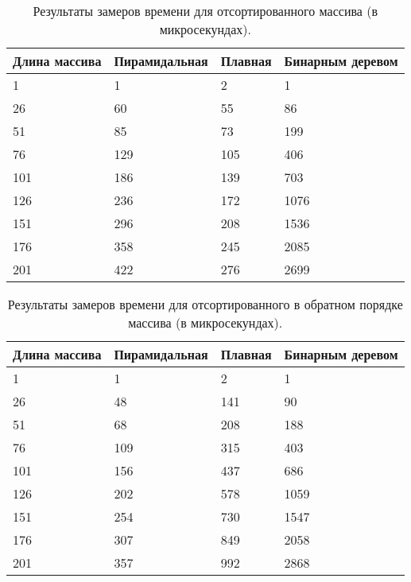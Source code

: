 \begin{table}[h]
	\begin{center}
		\captionsetup{justification=raggedright,singlelinecheck=off}
		\caption{\label{tbl:best}Результаты замеров времени для отсортированного массива (в микросекундах).}
		\begin{tabular}{|l|l|l|l|}
			
			\hline
			Длина массива&Пирамидальная&Плавная&Бинарным деревом\\
			\hline
			1 & 1 & 2 & 1 \\
			\hline
			26 & 60 & 55 & 86 \\
			\hline
			51 & 85 & 73 & 199 \\
			\hline
			76 & 129 & 105 & 406 \\
			\hline
			101 & 186 & 139 & 703 \\
			\hline
			126 & 236 & 172 & 1076 \\
			\hline
			151 & 296 & 208 & 1536 \\
			\hline
			176 & 358 & 245 & 2085 \\
			\hline
			201 & 422 & 276 & 2699 \\
			\hline
			
		\end{tabular}
	\end{center}
\end{table}

\begin{table}[h]
	\begin{center}
		\captionsetup{justification=raggedright,singlelinecheck=off}
		\caption{\label{tbl:wor}Результаты замеров времени для отсортированного в обратном порядке массива (в микросекундах).}
		\begin{tabular}{|l|l|l|l|}
			
			\hline
			Длина массива&Пирамидальная&Плавная&Бинарным деревом\\
			\hline
			1 & 1 & 2 & 1 \\
			\hline
			26 & 48 & 141 & 90 \\
			\hline
			51 & 68 & 208 & 188 \\
			\hline
			76 & 109 & 315 & 403 \\
			\hline
			101 & 156 & 437 & 686 \\
			\hline
			126 & 202 & 578 & 1059 \\
			\hline
			151 & 254 & 730 & 1547 \\
			\hline
			176 & 307 & 849 & 2058 \\
			\hline
			201 & 357 & 992 & 2868 \\
			\hline
			
		\end{tabular}
	\end{center}
\end{table}

